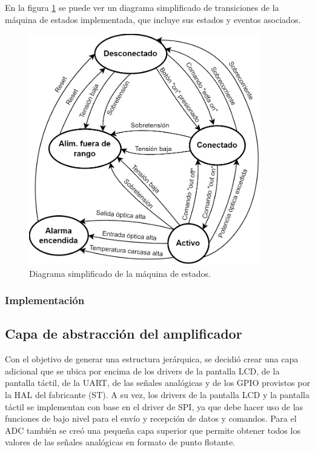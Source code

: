 En la figura \ref{fig:diagFSM} se puede ver un diagrama simplificado de transiciones de la máquina de estados implementada, que incluye sus estados y eventos asociados.

\begin{figure}[H]
\centering
\includegraphics[width=0.9\textwidth]{./Figures/diagFSM.png}
\caption{Diagrama simplificado de la máquina de estados.}
\label{fig:diagFSM}
\end{figure}

\subsubsection{Implementación}


\subsection{Capa de abstracción del amplificador}

Con el objetivo de generar una estructura jerárquica, se decidió crear una capa adicional que se ubica por encima de los drivers de la pantalla LCD, de la pantalla táctil, de la UART, de las señales analógicas y de los GPIO provistos por la HAL del fabricante (ST). A su vez, los drivers de la pantalla LCD y la pantalla táctil se implementan con base en el driver de SPI, ya que debe hacer uso de las funciones de bajo nivel para el envío y recepción de datos y comandos. Para el ADC también se creó una pequeña capa superior que permite obtener todos los valores de las señales analógicas en formato de punto flotante.

